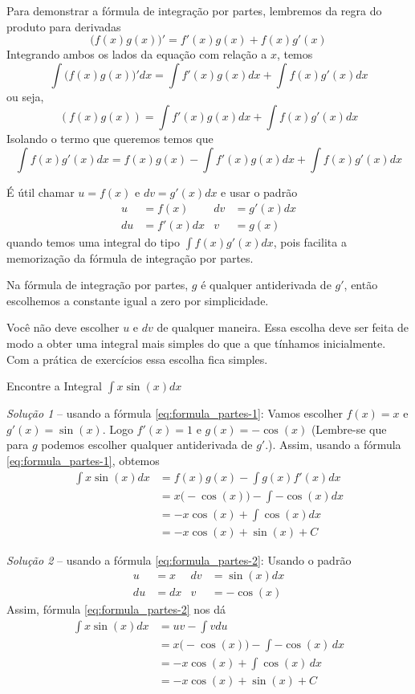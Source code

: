 Para demonstrar a fórmula de integração por partes,
lembremos da regra do produto para derivadas
\[
  \big(f(x)g(x)\big)'
  = f'(x)g(x) + f(x)g'(x)
\]
Integrando ambos os lados da equação com relação a $x$, temos
\[
  \int \big(f(x)g(x)\big)' dx
  = \int f'(x)g(x) dx + \int f(x)g'(x) dx
\]
ou seja,
\[
  (f(x)g(x)) = \int f'(x)g(x) dx+ \int f(x)g'(x) dx
\]
Isolando o termo que queremos temos que
\[
  \int f(x)g'(x) dx= f(x)g(x)-\int f'(x)g(x) dx+ \int f(x)g'(x) dx
\]

É útil chamar $u=f(x)$ e $dv=g'(x)dx$ e usar o padrão
\begin{align*}
  u  & = f(x)    &  dv & = g'(x)dx \\
  du & = f'(x)dx &  v  & = g(x)
\end{align*}
quando temos uma integral do tipo $\int f(x)g'(x)dx$,
pois facilita a memorização da fórmula de integração por partes.

Na fórmula de integração por partes, $g$ é qualquer
antiderivada de $g'$, então escolhemos a constante igual a zero por simplicidade.

Você não deve escolher $u$ e $dv$ de qualquer maneira.
Essa escolha deve ser feita de modo a obter uma integral mais
simples do que a que tínhamos inicialmente. Com a prática de
exercícios essa escolha fica simples.

\begin{example} \label{ex:ex1partes}
  Encontre a Integral \(\int x \sin(x)dx\)

  \solution
  \emph{Solução 1} -- usando a fórmula \eqref{eq:formula_partes-1}:
  Vamos escolher $f(x)=x$ e $g'(x)= \sin(x)$.
  Logo $f'(x)=1$ e $g(x)= -\cos(x)$ (Lembre-se que para $g$
  podemos escolher qualquer antiderivada de $g'$.).
  Assim, usando a fórmula \ref{eq:formula_partes-1}, obtemos
  \begin{align*}
    \int x\sin(x)dx
    & = f(x)g(x)- \int g(x)f'(x)dx \\
    & = x\big(-\cos(x)\big)- \int -\cos(x)dx \\
    & = -x \cos(x) + \int \cos(x) dx \\
    & = -x \cos(x) + \sin(x)  + C
  \end{align*}

  \emph{Solução 2} -- usando a fórmula \eqref{eq:formula_partes-2}:
  Usando o padrão
  \begin{align*}
    u  & =  x & dv & = \sin(x) dx \\
    du & = dx & v  & = -\cos(x)
  \end{align*}
  Assim, fórmula \eqref{eq:formula_partes-2} nos dá
  \begin{align*}
    \int x\sin(x)dx
    & = uv- \int vdu \\
    & = x\big(-\cos(x)\big)- \int -\cos(x)\,dx \\
    & = -x \cos(x) + \int \cos(x)\, dx \\
    & = -x \cos(x) + \sin(x)  + C
  \end{align*}
\end{example}

